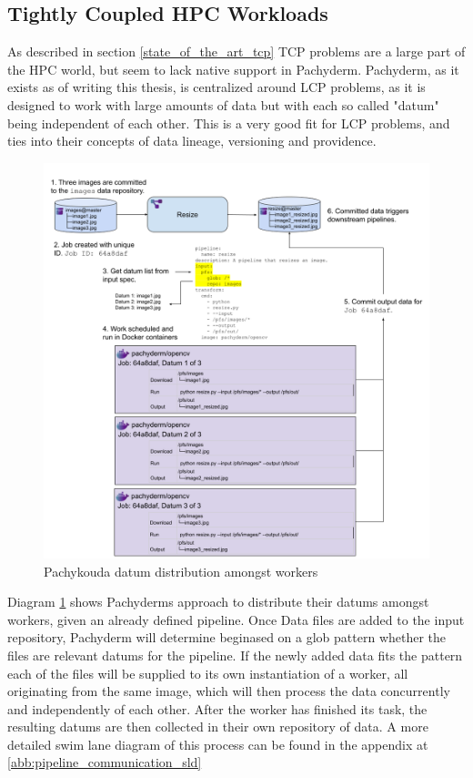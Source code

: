
\subsection{Tightly Coupled HPC Workloads} 
\label{tcp_hpc_workloads}

As described in section \ref{state_of_the_art_tcp} \ac{TCP} problems are a large part of the \ac{HPC} world,  but seem to lack native support in Pachyderm.
Pachyderm, as it exists as of writing this thesis, is centralized around \ac{LCP} problems, as it is designed to work with large amounts of data but with each so called "datum" being independent of each other.
This is a very good fit for \ac{LCP} problems, and ties into their concepts of data lineage, versioning and providence.

\begin{figure}[htb]
    \centering
    \includegraphics[width=14cm]{graphics/datum_distribution_amongst workers.png}
    \caption[Pachykouda datum distribution amongst workers]{Pachykouda datum distribution amongst workers \footnotemark}
    \label{abb:datum_distribution_amongst workers}
\end{figure}


Diagram \ref{abb:datum_distribution_amongst workers} shows Pachyderms approach to distribute their datums amongst workers, given an already defined pipeline.
Once Data files are added to the input repository, Pachyderm will determine beginased on a glob pattern whether the files are relevant datums for the pipeline.
If the newly added data fits the pattern each of the files will be supplied to its own instantiation of a worker, all originating from the same image, which will then process the data concurrently and independently of each other.
After the worker has finished its task, the resulting datums are then collected in their own repository of data.
A more detailed swim lane diagram of this process can be found in the appendix at \ref{abb:pipeline_communication_sld}


